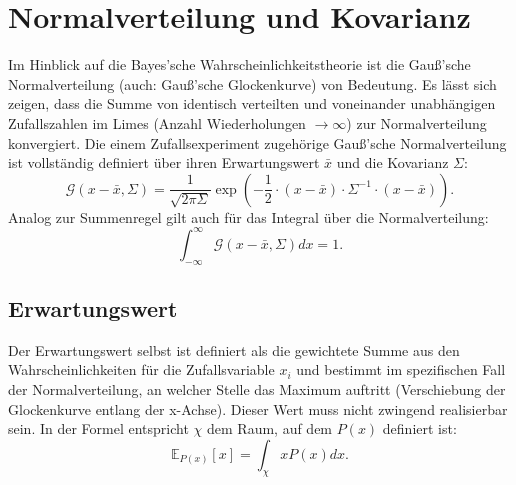 \section{Normalverteilung und Kovarianz}

Im Hinblick auf die Bayes'sche Wahrscheinlichkeitstheorie ist die Gauß'sche Normalverteilung (auch: Gauß'sche Glockenkurve) von Bedeutung.
Es lässt sich zeigen, dass die Summe von identisch verteilten und voneinander unabhängigen Zufallszahlen im Limes (Anzahl Wiederholungen $\rightarrow \infty$) zur Normalverteilung konvergiert.
Die einem Zufallsexperiment zugehörige Gauß'sche Normalverteilung ist vollständig definiert über ihren Erwartungswert $\bar{x}$ und die Kovarianz $\Sigma$:
\begin{equation}
\mathcal{G} (x - \bar{x}, \Sigma) = \displaystyle\frac{1}{\sqrt{2 \pi \Sigma}} \exp \left(- \displaystyle\frac{1}{2} \cdot (x - \bar{x}) \cdot \Sigma^{-1} \cdot (x - \bar{x}) \right).
\end{equation}
Analog zur Summenregel gilt auch für das Integral über die Normalverteilung:
\begin{equation} 
\int_{- \infty}^{\infty} \mathcal{G} (x - \bar{x}, \Sigma) dx = 1.
\end{equation}

\subsection{Erwartungswert}
Der Erwartungswert selbst ist definiert als die gewichtete Summe aus den Wahrscheinlichkeiten für die Zufallsvariable $x _i$ und bestimmt im spezifischen Fall der Normalverteilung, an welcher Stelle das Maximum auftritt (Verschiebung der Glockenkurve entlang der x-Achse). Dieser Wert muss nicht zwingend realisierbar sein. In der Formel entspricht $\chi$ dem Raum, auf dem $P(x)$ definiert ist:
\begin{equation}
\mathbb{E} _{P(x)} [x] = \int_{\chi} x P(x) dx .
\end{equation}

